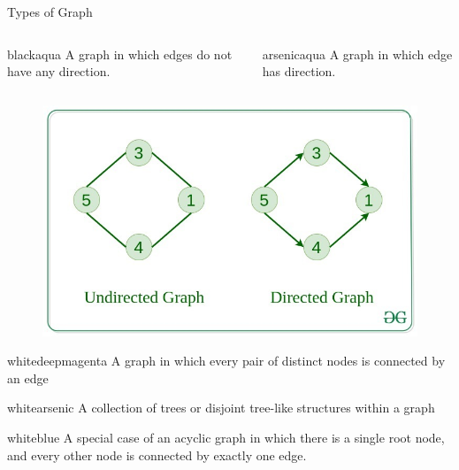 \documentclass[13pt]{beamer}
\begin{document}
	\begin{frame}[t,allowframebreaks]{Types of Graph}
		\begin{columns}
			\begin{bee}[Undirected Graph,width = 6cm]{black}{aqua}
				A graph in which edges do not have any direction.
			\end{bee}
			\begin{Rbee}[Directed Graph,width = 6cm]{arsenic}{aqua}
				A graph in which edge has direction.
			\end{Rbee}
		\end{columns}
		\begin{figure}
			\centering
			\href{https://media.geeksforgeeks.org/wp-content/uploads/20200630114438/directed.jpg}{
				\includegraphics[height =0.37\paperheight]{Images/directed.png}
			}
		\end{figure}


		\begin{bee}[Complete Graph,width = 8cm]{white}{deepmagenta}
			A graph in which every pair of distinct nodes is connected by an edge
		\end{bee}

		\begin{Rbee}[Forest,width = 0.9\paperwidth]{white}{arsenic}
			A collection of trees or disjoint tree-like structures within a graph
		\end{Rbee}
		\begin{bee}[Tree,width = 0.9\paperwidth]{white}{blue}
			A special case of an acyclic graph in which there is a single root node, and every other node is connected by exactly one edge.
		\end{bee}


	\end{frame}
\end{document}
